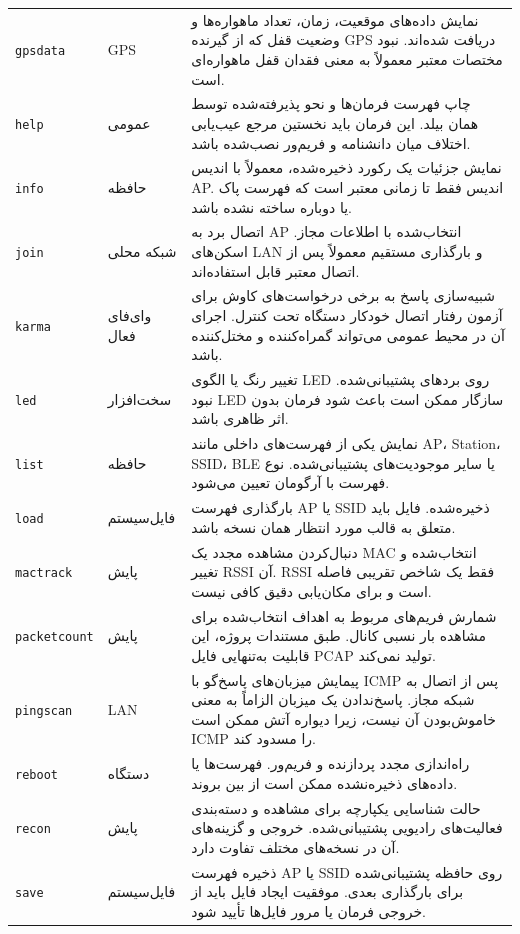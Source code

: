 \documentclass[11pt,a4paper]{article}
\newcommand{\lr}[1]{\foreignlanguage{english}{#1}}
\newcommand{\en}[1]{\lr{#1}}
\newcommand{\cmd}[1]{\lr{\nolinkurl{#1}}}
\begin{document}
\begin{longtable}{>{\raggedright\arraybackslash}p{3.4cm} >{\raggedleft\arraybackslash}p{3.2cm} >{\raggedleft\arraybackslash}p{8.7cm}}
\cmd{gpsdata} & \en{GPS} & نمایش داده‌های موقعیت، زمان، تعداد ماهواره‌ها و وضعیت قفل که از گیرنده GPS دریافت شده‌اند. نبود مختصات معتبر معمولاً به معنی فقدان قفل ماهواره‌ای است. \\
\cmd{help} & عمومی & چاپ فهرست فرمان‌ها و نحو پذیرفته‌شده توسط همان بیلد. این فرمان باید نخستین مرجع عیب‌یابی اختلاف میان دانشنامه و فریم‌ور نصب‌شده باشد. \\
\cmd{info} & حافظه & نمایش جزئیات یک رکورد ذخیره‌شده، معمولاً با اندیس AP. اندیس فقط تا زمانی معتبر است که فهرست پاک یا دوباره ساخته نشده باشد. \\
\cmd{join} & شبکه محلی & اتصال برد به AP انتخاب‌شده با اطلاعات مجاز. اسکن‌های LAN و بارگذاری مستقیم معمولاً پس از اتصال معتبر قابل استفاده‌اند. \\
\cmd{karma} & وای‌فای فعال & شبیه‌سازی پاسخ به برخی درخواست‌های کاوش برای آزمون رفتار اتصال خودکار دستگاه تحت کنترل. اجرای آن در محیط عمومی می‌تواند گمراه‌کننده و مختل‌کننده باشد. \\
\cmd{led} & سخت‌افزار & تغییر رنگ یا الگوی LED روی بردهای پشتیبانی‌شده. نبود LED سازگار ممکن است باعث شود فرمان بدون اثر ظاهری باشد. \\
\cmd{list} & حافظه & نمایش یکی از فهرست‌های داخلی مانند AP، Station، SSID، BLE یا سایر موجودیت‌های پشتیبانی‌شده. نوع فهرست با آرگومان تعیین می‌شود. \\
\cmd{load} & فایل‌سیستم & بارگذاری فهرست AP یا SSID ذخیره‌شده. فایل باید متعلق به قالب مورد انتظار همان نسخه باشد. \\
\cmd{mactrack} & پایش & دنبال‌کردن مشاهده مجدد یک MAC انتخاب‌شده و تغییر RSSI آن. RSSI فقط یک شاخص تقریبی فاصله است و برای مکان‌یابی دقیق کافی نیست. \\
\cmd{packetcount} & پایش & شمارش فریم‌های مربوط به اهداف انتخاب‌شده برای مشاهده بار نسبی کانال. طبق مستندات پروژه، این قابلیت به‌تنهایی فایل \en{PCAP} تولید نمی‌کند. \\
\cmd{pingscan} & \en{LAN} & پیمایش میزبان‌های پاسخ‌گو با \en{ICMP} پس از اتصال به شبکه مجاز. پاسخ‌ندادن یک میزبان الزاماً به معنی خاموش‌بودن آن نیست، زیرا دیواره آتش ممکن است ICMP را مسدود کند. \\
\cmd{reboot} & دستگاه & راه‌اندازی مجدد پردازنده و فریم‌ور. فهرست‌ها یا داده‌های ذخیره‌نشده ممکن است از بین بروند. \\
\cmd{recon} & پایش & حالت شناسایی یکپارچه برای مشاهده و دسته‌بندی فعالیت‌های رادیویی پشتیبانی‌شده. خروجی و گزینه‌های آن در نسخه‌های مختلف تفاوت دارد. \\
\cmd{save} & فایل‌سیستم & ذخیره فهرست AP یا SSID روی حافظه پشتیبانی‌شده برای بارگذاری بعدی. موفقیت ایجاد فایل باید از خروجی فرمان یا مرور فایل‌ها تأیید شود. \\

\end{longtable}
\end{document}
